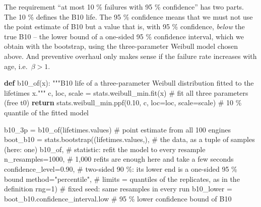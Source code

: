 \documentclass[
  letterpaper,
  DIV=11,
  numbers=noendperiod]{scrreprt}
\newenvironment{Shaded}{\begin{snugshade}}{\end{snugshade}}
\newcommand{\CommentTok}[1]{\textcolor[rgb]{0.37,0.37,0.37}{#1}}
\newcommand{\ControlFlowTok}[1]{\textcolor[rgb]{0.00,0.23,0.31}{\textbf{#1}}}
\newcommand{\DecValTok}[1]{\textcolor[rgb]{0.68,0.00,0.00}{#1}}
\newcommand{\FloatTok}[1]{\textcolor[rgb]{0.68,0.00,0.00}{#1}}
\newcommand{\KeywordTok}[1]{\textcolor[rgb]{0.00,0.23,0.31}{\textbf{#1}}}
\newcommand{\NormalTok}[1]{\textcolor[rgb]{0.00,0.23,0.31}{#1}}
\newcommand{\OperatorTok}[1]{\textcolor[rgb]{0.37,0.37,0.37}{#1}}
\newcommand{\StringTok}[1]{\textcolor[rgb]{0.13,0.47,0.30}{#1}}
\begin{document}
The requirement ``at most 10 \% failures with 95 \% confidence'' has two
parts. The 10 \% defines the B10 life. The 95 \% confidence means that
we must not use the point estimate of B10 but a value that is, with 95
\% confidence, \emph{below} the true B10 -- the lower bound of a
one-sided 95 \% confidence interval, which we obtain with the bootstrap,
using the three-parameter Weibull model chosen above. And preventive
overhaul only makes sense if the failure rate increases with age,
i.e.~\(\beta > 1\).

\begin{Shaded}
\begin{Highlighting}[]
\KeywordTok{def}\NormalTok{ b10\_of(x):}
    \CommentTok{"""B10 life of a three{-}parameter Weibull distribution fitted to the lifetimes x."""}
\NormalTok{    c, loc, scale }\OperatorTok{=}\NormalTok{ stats.weibull\_min.fit(x)                     }\CommentTok{\# fit all three parameters (free t0)}
    \ControlFlowTok{return}\NormalTok{ stats.weibull\_min.ppf(}\FloatTok{0.10}\NormalTok{, c, loc}\OperatorTok{=}\NormalTok{loc, scale}\OperatorTok{=}\NormalTok{scale)  }\CommentTok{\# 10 \% quantile of the fitted model}

\NormalTok{b10\_3p }\OperatorTok{=}\NormalTok{ b10\_of(lifetimes.values)                  }\CommentTok{\# point estimate from all 100 engines}
\NormalTok{boot\_b10 }\OperatorTok{=}\NormalTok{ stats.bootstrap((lifetimes.values,),    }\CommentTok{\# the data, as a tuple of samples (here: one)}
\NormalTok{                           b10\_of,                 }\CommentTok{\# statistic: refit the model to every resample}
\NormalTok{                           n\_resamples}\OperatorTok{=}\DecValTok{1000}\NormalTok{,       }\CommentTok{\# 1,000 refits are enough here and take a few seconds}
\NormalTok{                           confidence\_level}\OperatorTok{=}\FloatTok{0.90}\NormalTok{,  }\CommentTok{\# two{-}sided 90 \%: its lower end is a one{-}sided 95 \% bound}
\NormalTok{                           method}\OperatorTok{=}\StringTok{"percentile"}\NormalTok{,    }\CommentTok{\# limits = quantiles of the replicates, as in the definition}
\NormalTok{                           rng}\OperatorTok{=}\DecValTok{1}\NormalTok{)                  }\CommentTok{\# fixed seed: same resamples in every run}
\NormalTok{b10\_lower }\OperatorTok{=}\NormalTok{ boot\_b10.confidence\_interval.low       }\CommentTok{\# 95 \% lower confidence bound of B10}


\end{Highlighting}
\end{Shaded}
\end{document}
